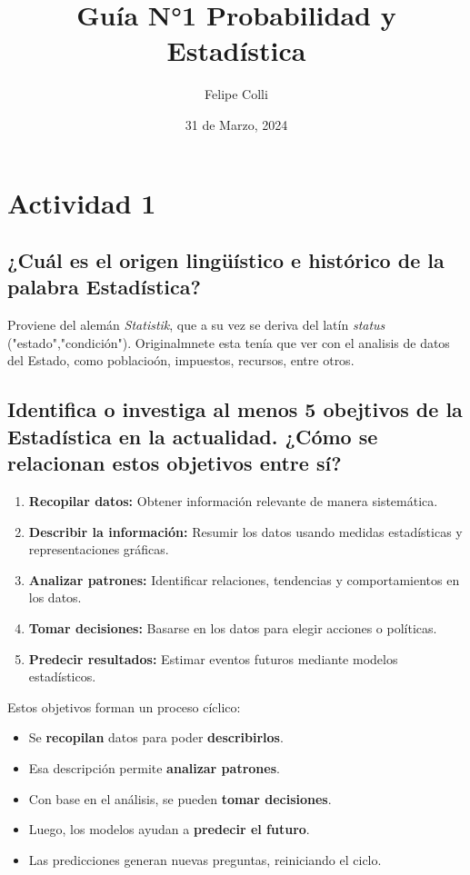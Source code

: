 \documentclass[12pt, letterpaper]{article}
\title{ Guía N°1 Probabilidad y Estadística}
\author{Felipe Colli}
\date{31 de Marzo, 2024}
\begin{document}
\maketitle
\tableofcontents

\section{Actividad 1}
\subsection{¿Cuál es el origen lingüístico e histórico de la palabra Estadística?}
Proviene del alemán \textit{Statistik}, que a su vez se deriva del latín \textit{status} ("estado","condición"). Originalmnete esta tenía que ver con el analisis de datos del Estado, como poblacioón, impuestos, recursos, entre otros.

\subsection{Identifica o investiga al menos 5 obejtivos de la Estadística en la actualidad. ¿Cómo se relacionan estos objetivos entre sí?}
\begin{enumerate}
    \item \textbf{Recopilar datos:} Obtener información relevante de manera sistemática.
    \item \textbf{Describir la información:} Resumir los datos usando medidas estadísticas y representaciones gráficas.
    \item \textbf{Analizar patrones:} Identificar relaciones, tendencias y comportamientos en los datos.
    \item \textbf{Tomar decisiones:} Basarse en los datos para elegir acciones o políticas.
    \item \textbf{Predecir resultados:} Estimar eventos futuros mediante modelos estadísticos.
\end{enumerate}
Estos objetivos forman un proceso cíclico:

\begin{itemize}
    \item Se \textbf{recopilan} datos para poder \textbf{describirlos}.
    \item Esa descripción permite \textbf{analizar patrones}.
    \item Con base en el análisis, se pueden \textbf{tomar decisiones}.
    \item Luego, los modelos ayudan a \textbf{predecir el futuro}.
    \item Las predicciones generan nuevas preguntas, reiniciando el ciclo.
\end{itemize}
\end{document}
